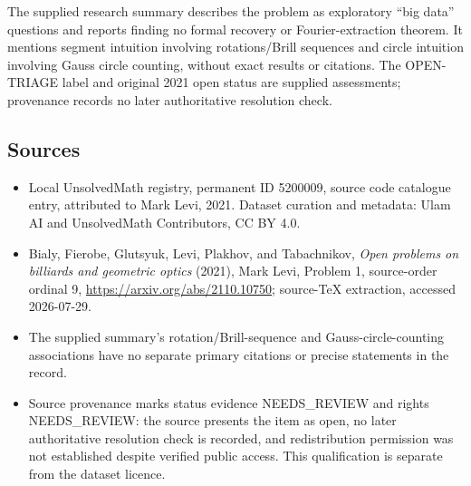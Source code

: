 \documentclass[11pt]{article}
\begin{document}
The supplied research summary describes the problem as exploratory ``big data'' questions and reports finding no formal recovery or Fourier-extraction theorem. It mentions segment intuition involving rotations/Brill sequences and circle intuition involving Gauss circle counting, without exact results or citations. The OPEN-TRIAGE label and original 2021 open status are supplied assessments; provenance records no later authoritative resolution check.
\subsection{Sources}
\begin{itemize}
\item Local UnsolvedMath registry, permanent ID 5200009, source code catalogue entry, attributed to Mark Levi, 2021. Dataset curation and metadata: Ulam AI and UnsolvedMath Contributors, CC BY 4.0.
\item Bialy, Fierobe, Glutsyuk, Levi, Plakhov, and Tabachnikov, \emph{Open problems on billiards and geometric optics} (2021), Mark Levi, Problem 1, source-order ordinal 9, \url{https://arxiv.org/abs/2110.10750}; source-TeX extraction, accessed 2026-07-29.
\item The supplied summary's rotation/Brill-sequence and Gauss-circle-counting associations have no separate primary citations or precise statements in the record.
\item Source provenance marks status evidence NEEDS\_REVIEW and rights NEEDS\_REVIEW: the source presents the item as open, no later authoritative resolution check is recorded, and redistribution permission was not established despite verified public access. This qualification is separate from the dataset licence.
\end{itemize}
\end{document}
